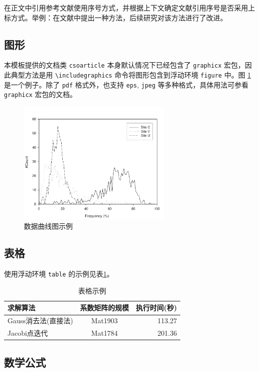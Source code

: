 \documentclass[UTF8]{csoarticle}
\begin{document}
在正文中引用参考文献使用序号方式，并根据上下文确定文献引用序号是否采用上标方式。举例：在文献\cite{bib1}中提出一种方法，后续研究对该方法进行了改进。

\subsection{图形}

本模板提供的文档类 \verb|csoarticle| 本身默认情况下已经包含了 \verb|graphicx| 宏包，因此典型方法是用 \verb|\includegraphics| 命令将图形包含到浮动环境 \verb|figure| 中。图 \ref{fig:sample} 是一个例子。除了 \verb|pdf| 格式外，也支持 \verb|eps|, \verb|jpeg| 等多种格式，具体用法可参看 \verb|graphicx| 宏包的文档。
\begin{figure}
\centering\includegraphics[height=6cm]{figsamp}
\caption{数据曲线图示例}
\label{fig:sample}
\end{figure}

\subsection{表格}

使用浮动环境 \verb|table| 的示例见表\ref{tab:sample}。
\begin{table}
  \caption{表格示例}
  \label{tab:sample}
  \centering
  \begin{tabular}{lcr}%
    \hline
    求解算法                & 系数矩阵的规模    & 执行时间(秒)  \\
    \hline
    Gauss消去法(直接法)     & Mat1903           &  113.27       \\
    Jacobi点迭代            & Mat1784           &  201.36       \\
    \hline
  \end{tabular}
\end{table}

\subsection{数学公式}
\end{document}
